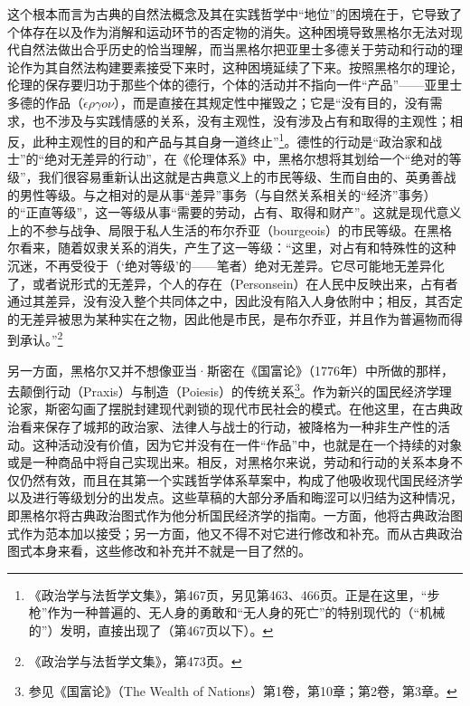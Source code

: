 这个根本而言为古典的自然法概念及其在实践哲学中“地位”的困境在于，它导致了个体存在以及作为消解和运动环节的否定物的消失。这种困境导致黑格尔无法对现代自然法做出合乎历史的恰当理解，而当黑格尔把亚里士多德关于劳动和行动的理论作为其自然法构建要素接受下来时，这种困境延续了下来。按照黑格尔的理论，伦理的保存要归功于那些个体的德行，个体的活动并不指向一件“产品”——亚里士多德的作品（$\acute{\epsilon}\rho\gamma o\nu$），而是直接在其规定性中摧毁之；它是“没有目的，没有需求，也不涉及与实践情感的关系，没有主观性，没有涉及占有和取得的主观性；相反，此种主观性的目的和产品与其自身一道终止”\footnote{《政治学与法哲学文集》，第467页，另见第463、466页。正是在这里，“步枪”作为一种普遍的、无人身的勇敢和“无人身的死亡”的特别现代的（“机械的”）发明，直接出现了（第467页以下）。}。德性的行动是“政治家和战士”的“绝对无差异的行动”，在《伦理体系》中，黑格尔想将其划给一个“绝对的等级”，我们很容易重新认出这就是古典意义上的市民等级、生而自由的、英勇善战的男性等级。与之相对的是从事“差异”事务（与自然关系相关的“经济”事务）的“正直等级”，这一等级从事“需要的劳动，占有、取得和财产”。这就是现代意义上的不参与战争、局限于私人生活的布尔乔亚（bourgeois）的市民等级。在黑格尔看来，随着奴隶关系的消失，产生了这一等级：“这里，对占有和特殊性的这种沉迷，不再受役于（‘绝对等级’的——笔者）绝对无差异。它尽可能地无差异化了，或者说形式的无差异，个人的存在（Personsein）在人民中反映出来，占有者通过其差异，没有没入整个共同体之中，因此没有陷入人身依附中；相反，其否定的无差异被思为某种实在之物，因此他是市民，是布尔乔亚，并且作为普遍物而得到承认。”\footnote{《政治学与法哲学文集》，第473页。}

另一方面，黑格尔又并不想像亚当·斯密在《国富论》（1776年）中所做的那样，去颠倒行动（Praxis）与制造（Poiesis）的传统关系\footnote{参见《国富论》（The Wealth of Nations）第1卷，第10章；第2卷，第3章。}。作为新兴的国民经济学理论家，斯密勾画了摆脱封建现代剥锁的现代市民社会的模式。在他这里，在古典政治看来保存了城邦的政治家、法律人与战士的行动，被降格为一种非生产性的活动。这种活动没有价值，因为它并没有在一件“作品”中，也就是在一个持续的对象或是一种商品中将自己实现出来。相反，对黑格尔来说，劳动和行动的关系本身不仅仍然有效，而且在其第一个实践哲学体系草案中，构成了他吸收现代国民经济学以及进行等级划分的出发点。这些草稿的大部分矛盾和晦涩可以归结为这种情况，即黑格尔将古典政治图式作为他分析国民经济学的指南。一方面，他将古典政治图式作为范本加以接受；另一方面，他又不得不对它进行修改和补充。而从古典政治图式本身来看，这些修改和补充并不就是一目了然的。

